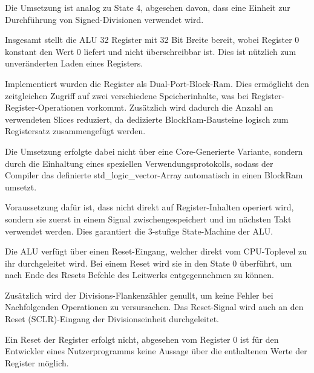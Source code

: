 Die Umsetzung ist analog zu State 4, abgesehen davon, dass eine Einheit zur Durchf\"uhrung von Signed-Divisionen verwendet wird.

Insgesamt stellt die ALU 32 Register mit 32 Bit Breite bereit, wobei Register 0 konstant den Wert 0 liefert und nicht \"uberschreibbar ist. Dies ist n\"utzlich zum unveränderten Laden eines Registers.

Implementiert wurden die Register als Dual-Port-Block-Ram. Dies erm\"oglicht den zeitgleichen Zugriff auf zwei verschiedene Speicherinhalte, was bei Register-Register-Operationen vorkommt. Zusätzlich wird dadurch die Anzahl an verwendeten Slices reduziert, da dedizierte BlockRam-Bausteine logisch zum Registersatz zusammengef\"ugt werden.\vspace{10pt}

Die Umsetzung erfolgte dabei nicht \"uber eine Core-Generierte Variante, sondern durch die Einhaltung eines speziellen Verwendungsprotokolls, sodass der Compiler das definierte std\_logic\_vector-Array automatisch in einen BlockRam umsetzt.

Voraussetzung daf\"ur ist, dass nicht direkt auf Register-Inhalten operiert wird, sondern sie zuerst in einem Signal zwischengespeichert und im nächsten Takt verwendet werden. Dies garantiert die 3-stufige State-Machine der ALU.

Die ALU verf\"ugt \"uber einen Reset-Eingang, welcher direkt vom CPU-Toplevel zu ihr durchgeleitet wird. Bei einem Reset wird sie in den State 0 \"uberf\"uhrt, um nach Ende des Resets Befehle des Leitwerks entgegennehmen zu k\"onnen.

Zusätzlich wird der Divisions-Flankenzähler genullt, um keine Fehler bei Nachfolgenden Operationen zu versursachen. Das Reset-Signal wird auch an den Reset (SCLR)-Eingang der Divisionseinheit durchgeleitet.

Ein Reset der Register erfolgt nicht, abgesehen vom Register 0 ist f\"ur den Entwickler eines Nutzerprogramms keine Aussage \"uber die enthaltenen Werte der Register m\"oglich.

